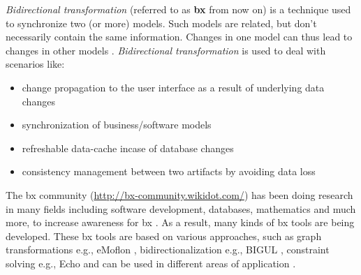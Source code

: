 \textit{Bidirectional transformation} (referred to as \textbf{bx} from now on) is a technique used to synchronize two (or more) models. Such models are related, but don't necessarily contain the same information. Changes in one model can thus lead to changes in other models \cite{bx-grace}.
\newline\newline\textit{Bidirectional transformation} is used to deal with scenarios like\cite{bx-theoryandappl}:
\begin{itemize}
	\item {change propagation to the user interface as a result of underlying data changes}	
	\item {synchronization of business/software models}
	\item {refreshable data-cache incase of database changes}
	\item {consistency management between two artifacts by avoiding data loss}
\end{itemize}
The bx community (\url{http://bx-community.wikidot.com/}) has been doing research in many fields including software development, databases, mathematics and much more, to increase awareness for bx \cite{bx-grace}\cite{bx-dagstuhl}. As a result, many kinds of bx tools are being developed. These bx tools are based on various approaches, such as graph transformations e.g., eMoflon \cite{emoflon-part4}, bidirectionalization e.g., BIGUL \cite{bigul}, constraint solving e.g., Echo \cite{echo} and can be used in different areas of application \cite{bx-community}.


